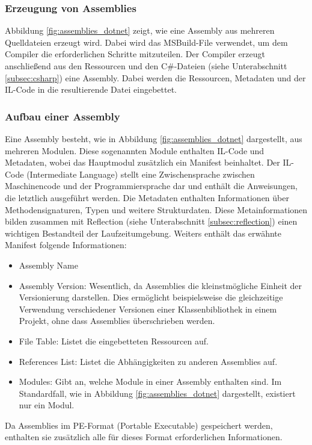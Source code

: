 \subsubsection{Erzeugung von Assemblies}
Abbildung \ref{fig:assemblies_dotnet} zeigt, wie eine Assembly aus mehreren Quelldateien erzeugt wird. Dabei wird das MSBuild-File verwendet, um dem Compiler die erforderlichen Schritte mitzuteilen. Der Compiler erzeugt anschließend aus den Ressourcen und den C\#-Dateien (siehe Unterabschnitt \ref{subsec:csharp}) eine Assembly. Dabei werden die Ressourcen, Metadaten und der IL-Code in die resultierende Datei eingebettet.

\subsubsection{Aufbau einer Assembly}
Eine Assembly besteht, wie in Abbildung \ref{fig:assemblies_dotnet} dargestellt, aus mehreren Modulen. Diese sogenannten Module enthalten IL-Code und Metadaten, wobei das Hauptmodul zusätzlich ein Manifest beinhaltet.  
Der IL-Code (Intermediate Language) stellt eine Zwischensprache zwischen Maschinencode und der Programmiersprache dar und enthält die Anweisungen, die letztlich ausgeführt werden.  
Die Metadaten enthalten Informationen über Methodensignaturen, Typen und weitere Strukturdaten. Diese Metainformationen bilden zusammen mit Reflection (siehe Unterabschnitt \ref{subsec:reflection}) einen wichtigen Bestandteil der Laufzeitumgebung. Weiters enthält das erwähnte Manifest folgende Informationen:

\begin{itemize}
    \item Assembly Name
    \item Assembly Version: Wesentlich, da Assemblies die kleinstmögliche Einheit der Versionierung darstellen. Dies ermöglicht beispielsweise die gleichzeitige Verwendung verschiedener Versionen einer Klassenbibliothek in einem Projekt, ohne dass Assemblies überschrieben werden.
    \item File Table: Listet die eingebetteten Ressourcen auf.
    \item References List: Listet die Abhängigkeiten zu anderen Assemblies auf.
    \item Modules: Gibt an, welche Module in einer Assembly enthalten sind. Im Standardfall, wie in Abbildung \ref{fig:assemblies_dotnet} dargestellt, existiert nur ein Modul.
\end{itemize}

Da Assemblies im PE-Format (Portable Executable) \cite{MicrosoftLearn_PEFormat} gespeichert werden, enthalten sie zusätzlich alle für dieses Format erforderlichen Informationen.

